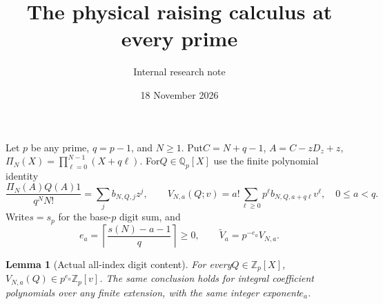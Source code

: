 \documentclass[11pt]{article}
\title{The physical raising calculus at every prime}
\author{Internal research note}\date{18 November 2026}
\newtheorem{lemma}{Lemma}\newtheorem{theorem}[lemma]{Theorem}
\begin{document}
\setlength{\emergencystretch}{1em}\maketitle
Let $p$ be any prime, $q=p-1$, and $N\ge1$.
Put$C=N+q-1$, $A=C-zD_z+z$,
$\Pi_N(X)=\prod_{\ell=0}^{N-1}(X+q\ell)$.
For$Q\in\mathbb Q_p[X]$ use the finite polynomial identity
\[
 \frac{\Pi_N(A)Q(A)1}{q^NN!}=\sum_jb_{N,Q,j}z^j,\qquad
 V_{N,a}(Q;v)=a!\sum_{\ell\ge0}p^\ell b_{N,Q,a+q\ell}v^\ell,
                 \quad0\le a<q .
\]
Write$s=s_p$ for the base-$p$ digit sum, and
\[
 e_a=\left\lceil\frac{s(N)-a-1}{q}\right\rceil\ge0,\qquad
                  \widetilde V_a=p^{-e_a}V_{N,a}.
\]

\begin{lemma}[Actual all-index digit content]\label{lem:content}
For every$Q\in\mathbb Z_p[X]$,
$V_{N,a}(Q)\in p^{e_a}\mathbb Z_p[v]$.
The same conclusion holds for integral coefficient polynomials
over any finite extension, with the same integer exponent$e_a$.
\end{lemma}
\end{document}
